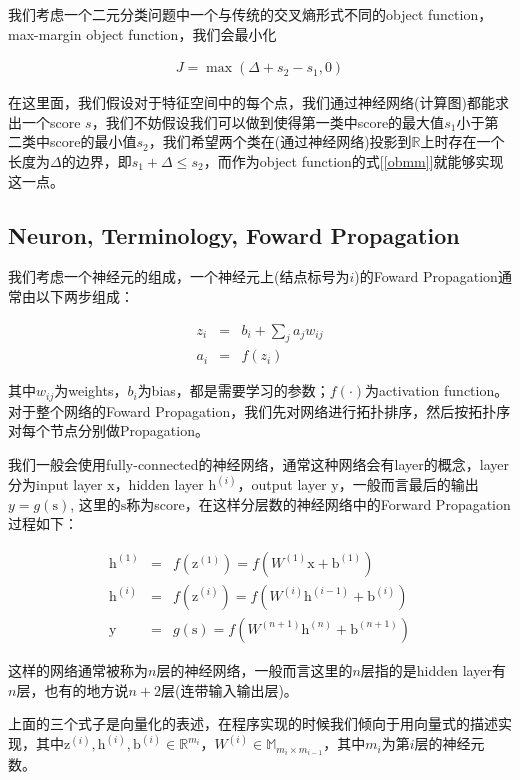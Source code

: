 \documentclass{article}
\begin{document}
我们考虑一个二元分类问题中一个与传统的交叉熵形式不同的object function，max-margin object function，我们会最小化

\begin{eqnarray}
\label{obmm}
J=\max(\Delta+s_2-s_1, 0)
\end{eqnarray}

在这里面，我们假设对于特征空间中的每个点，我们通过神经网络(计算图)都能求出一个score $s$，我们不妨假设我们可以做到使得第一类中score的最大值$s_1$小于第二类中score的最小值$s_2$，我们希望两个类在(通过神经网络)投影到$\mathbb{R}$上时存在一个长度为$\Delta$的边界，即$s_1+\Delta \le s_2$，而作为object function的式[\ref{obmm}]就能够实现这一点。

\subsection{Neuron, Terminology, Foward Propagation}

我们考虑一个神经元的组成，一个神经元上(结点标号为$i$)的Foward Propagation通常由以下两步组成：

\begin{eqnarray}
z_i &=& b_i + \sum_{j}{a_j w_{ij}} \\
a_i &=& f(z_i)
\end{eqnarray}

其中$w_{ij}$为weights，$b_i$为bias，都是需要学习的参数；$f(\cdot)$为activation function。对于整个网络的Foward Propagation，我们先对网络进行拓扑排序，然后按拓扑序对每个节点分别做Propagation。

我们一般会使用fully-connected的神经网络，通常这种网络会有layer的概念，layer分为input layer $\mathrm{x}$，hidden layer $\mathrm{h}^{(i)}$，output layer $\mathrm{y}$，一般而言最后的输出$y=g(\mathrm{s})$, 这里的$\mathrm{s}$称为score，在这样分层数的神经网络中的Forward Propagation过程如下：

\begin{eqnarray}
\mathrm{h}^{(1)} &=& f(\mathrm{z}^{(1)}) = f(W^{(1)}\mathrm{x}+\mathrm{b}^{(1)}) \\
\mathrm{h}^{(i)} &=& f(\mathrm{z}^{(i)}) = f(W^{(i)}\mathrm{h}^{(i-1)}+\mathrm{b}^{(i)}) \\
\mathrm{y} &=& g(\mathrm{s}) = f(W^{(n+1)}\mathrm{h}^{(n)}+\mathrm{b}^{(n+1)})
\end{eqnarray}

这样的网络通常被称为$n$层的神经网络，一般而言这里的$n$层指的是hidden layer有$n$层，也有的地方说$n+2$层(连带输入输出层)。

上面的三个式子是向量化的表述，在程序实现的时候我们倾向于用向量式的描述实现，其中$\mathrm{z}^{(i)},\mathrm{h}^{(i)},\mathrm{b}^{(i)}\in \mathbb{R}^{m_i}$，$W^{(i)} \in \mathbb{M}_{m_i\times m_{i-1}}$，其中$m_i$为第$i$层的神经元数。
\end{document}
